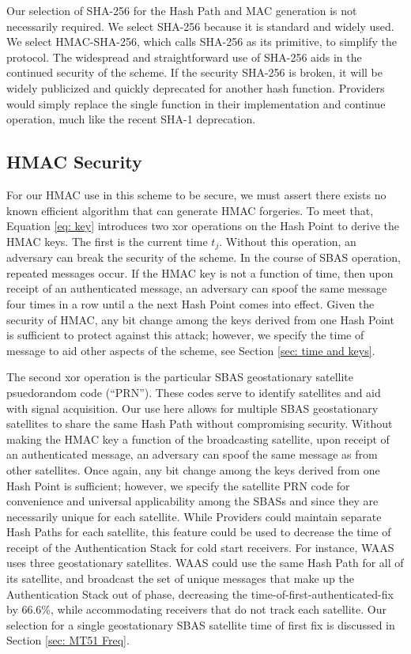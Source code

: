 \documentclass[letterpaper,times]{IONconf/IONconf}
\begin{document}
Our selection of SHA-256 for the Hash Path and MAC generation is not necessarily required.
We select SHA-256 because it is standard and widely used.
We select HMAC-SHA-256, which calls SHA-256 as its primitive, to simplify the protocol.
The widespread and straightforward use of SHA-256 aids in the continued security of the scheme.
If the security SHA-256 is broken, it will be widely publicized and quickly deprecated for another hash function.
Providers would simply replace the single function in their implementation and continue operation, much like the recent SHA-1 deprecation.

\subsection{HMAC Security} \label{sec: HMAC security}

For our HMAC use in this scheme to be secure, we must assert there exists no known efficient algorithm that can generate HMAC forgeries.
To meet that, Equation \ref{eq: key} introduces two xor operations on the Hash Point to derive the HMAC keys.
The first is the current time $t_j$.
Without this operation, an adversary can break the security of the scheme.
In the course of SBAS operation, repeated messages occur.
If the HMAC key is not a function of time, then upon receipt of an authenticated message, an adversary can spoof the same message four times in a row until a the next Hash Point comes into effect.
Given the security of HMAC, any bit change among the keys derived from one Hash Point is sufficient to protect against this attack; however, we specify the time of message to aid other aspects of the scheme, see Section \ref{sec: time and keys}.

The second xor operation is the particular SBAS geostationary satellite psuedorandom code (``PRN'').
These codes serve to identify satellites and aid with signal acquisition.
Our use here allows for multiple SBAS geostationary satellites to share the same Hash Path without compromising security.
Without making the HMAC key a function of the broadcasting satellite, upon receipt of an authenticated message, an adversary can spoof the same message as from other satellites.
Once again, any bit change among the keys derived from one Hash Point is sufficient; however, we specify the satellite PRN code for convenience and universal applicability among the SBASs and since they are necessarily unique for each satellite.
While Providers could maintain separate Hash Paths for each satellite, this feature could be used to decrease the time of receipt of the Authentication Stack for cold start receivers.
For instance, WAAS uses three geostationary satellites.
WAAS could use the same Hash Path for all of its satellite, and broadcast the set of unique messages that make up the Authentication Stack out of phase, decreasing the time-of-first-authenticated-fix by 66.6\%, while accommodating receivers that do not track each satellite.
Our selection for a single geostationary SBAS satellite time of first fix is discussed in Section \ref{sec: MT51 Freq}.
\end{document}
